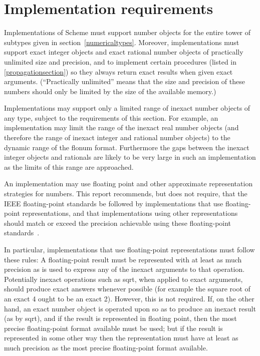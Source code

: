 \section{Implementation requirements}

\label{restrictions}

Implementations of Scheme must support number objects for
the entire tower of subtypes given in section~\ref{numericaltypes}.
Moreover, implementations must support exact integer 
objects and exact rational number objects of practically unlimited
size and precision, and to implement certain procedures (listed in
\ref{propagationsection}) so they always return exact results when
given exact arguments.  (``Practically unlimited'' means that the size
and precision of these numbers should only be limited by the size of
the available memory.)

Implementations may support only a limited range of inexact number
objects of any type, subject to the requirements of this section.  For
example, an implementation may limit the range of the inexact real
number objects (and therefore the range of inexact integer and
rational number objects) to the dynamic range of the flonum format.
Furthermore the gaps between the inexact integer objects and
rationals are likely to be very large in such an implementation as the
limits of this range are approached.

An implementation may use floating point and other approximate 
representation strategies for  numbers.
This report recommends, but does not require, that the IEEE 
floating-point standards be followed by implementations that use
floating-point representations, and that implementations using
other representations should match or exceed the precision achievable
using these floating-point standards~\cite{IEEE}.

In particular, implementations that use floating-point representations
must follow these rules: A floating-point result must be represented
with at least as much precision as is used to express any of the
inexact arguments to that operation.
Potentially inexact operations such as {\cf sqrt}, when
applied to exact arguments, should produce exact answers whenever possible
(for example the square root of an exact 4 ought to be an exact 2).
However, this is not required.
If, on the other hand, an exact number object is operated upon so as to produce an
inexact result (as by {\cf sqrt}), and if the result is represented in
floating point, then the most precise floating-point format available
must be used; but if the result is represented in some other way then
the representation must have at least as much precision as the most
precise floating-point format available.

